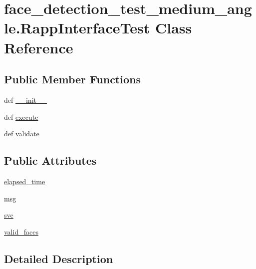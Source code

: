 \hypertarget{classface__detection__test__medium__angle_1_1RappInterfaceTest}{\section{face\-\_\-detection\-\_\-test\-\_\-medium\-\_\-angle.\-Rapp\-Interface\-Test Class Reference}
\label{classface__detection__test__medium__angle_1_1RappInterfaceTest}
}
\subsection*{Public Member Functions}
\begin{DoxyCompactItemize}
\item 
def \hyperlink{classface__detection__test__medium__angle_1_1RappInterfaceTest_a41ce8d443e514c67b551e60721c45980}{\-\_\-\-\_\-init\-\_\-\-\_\-}
\item 
def \hyperlink{classface__detection__test__medium__angle_1_1RappInterfaceTest_a04c714e1a3c573fed1fe1275f49048eb}{execute}
\item 
def \hyperlink{classface__detection__test__medium__angle_1_1RappInterfaceTest_af905412332c15506fb0db1a5c05393b4}{validate}
\end{DoxyCompactItemize}
\subsection*{Public Attributes}
\begin{DoxyCompactItemize}
\item 
\hyperlink{classface__detection__test__medium__angle_1_1RappInterfaceTest_a37ec3f79dabaff6ef2990f8ff300c575}{elapsed\-\_\-time}
\item 
\hyperlink{classface__detection__test__medium__angle_1_1RappInterfaceTest_a0f43a9b88bcebcc38d56305a724bda28}{msg}
\item 
\hyperlink{classface__detection__test__medium__angle_1_1RappInterfaceTest_af5a73ec70ac5c263a874897eeab2e719}{svc}
\item 
\hyperlink{classface__detection__test__medium__angle_1_1RappInterfaceTest_ad9f0e0c514ef73ca565f1d261bf37384}{valid\-\_\-faces}
\end{DoxyCompactItemize}


\subsection{Detailed Description}



